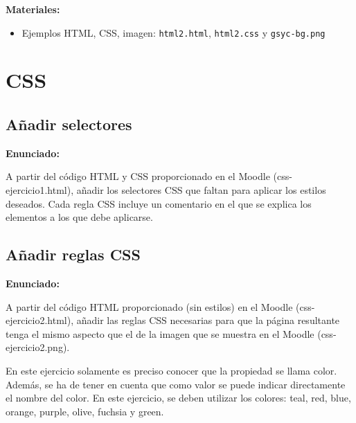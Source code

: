 \textbf{Materiales:}

\begin{itemize}
\item Ejemplos HTML, CSS, imagen:
 \verb|html2.html|, \verb|html2.css| y \verb|gsyc-bg.png|
\end{itemize}

\section{CSS}

\subsection{Añadir selectores}
\label{subsec:anadir-selectores}

\textbf{Enunciado:}

A partir del código HTML y CSS proporcionado en el Moodle (css-ejercicio1.html), añadir los selectores CSS que faltan para aplicar los estilos deseados. Cada regla CSS incluye un comentario en el que se explica los elementos a los que debe aplicarse.

\subsection{Añadir reglas CSS}
\label{subsec:anadir-reglas}

\textbf{Enunciado:}

A partir del código HTML proporcionado (sin estilos) en el Moodle (css-ejercicio2.html), añadir las reglas CSS necesarias para que la página resultante tenga el mismo aspecto que el de la imagen que se muestra en el Moodle (css-ejercicio2.png).

En este ejercicio solamente es preciso conocer que la propiedad se llama color. Además, se ha de tener en cuenta que como valor se puede indicar directamente el nombre del color. En este ejercicio, se deben utilizar los colores: teal, red, blue, orange, purple, olive, fuchsia y green.

